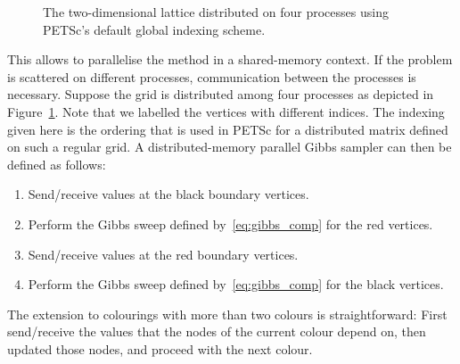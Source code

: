 \documentclass[
fontsize=11pt,
paper=a4,
numbers=noenddot
]{scrartcl}
\begin{document}
\begin{figure}[t]
    \caption{The two-dimensional lattice distributed on four processes using PETSc's default global indexing scheme.}\label{fig:latticedist}
\end{figure}

This allows to parallelise the method in a shared-memory context. If the problem is scattered on different processes, communication between the processes is necessary. Suppose the grid is distributed among four processes as depicted in Figure~\ref{fig:latticedist}. Note that we labelled the vertices with different indices. The indexing given here is the ordering that is used in PETSc for a distributed matrix defined on such a regular grid. A distributed-memory parallel Gibbs sampler can then be defined as follows:
\begin{enumerate}
    \item Send/receive values at the black boundary vertices.
    \item Perform the Gibbs sweep defined by~\eqref{eq:gibbs_comp} for the red vertices.
    \item Send/receive values at the red boundary vertices.
    \item Perform the Gibbs sweep defined by~\eqref{eq:gibbs_comp} for the black vertices.
\end{enumerate}
The extension to colourings with more than two colours is straightforward: First send/receive the values that the nodes of the current colour depend on, then updated those nodes, and proceed with the next colour.
\end{document}
